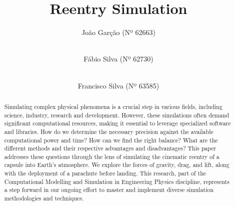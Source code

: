 \documentclass[runningheads]{llncs}
\begin{document}
\title{Reentry Simulation}

\author{João Garção (Nº 62663) \and\\ Fábio Silva (Nº 62730) \and \\Francisco Silva (Nº 63585)}

\authorrunning{ }





\maketitle      %



\begin{abstract}
Simulating complex physical phenomena is a crucial step in various fields, including science, industry, research and development. However, these simulations often demand significant computational resources, making it essential to leverage specialized software and libraries. How do we determine the necessary precision against the available computational power and time? How can we find the right balance? What are the different methods and their respective advantages and disadvantages? This paper addresses these questions through the lens of simulating the cinematic reentry of a capsule into Earth's atmosphere. We explore the forces of gravity, drag, and lift, along with the deployment of a parachute before landing. This research, part of the Computational Modelling and Simulation in Engineering Physics discipline, represents a step forward in our ongoing effort to master and implement diverse simulation methodologies and techniques.



\end{abstract}




\end{document}
